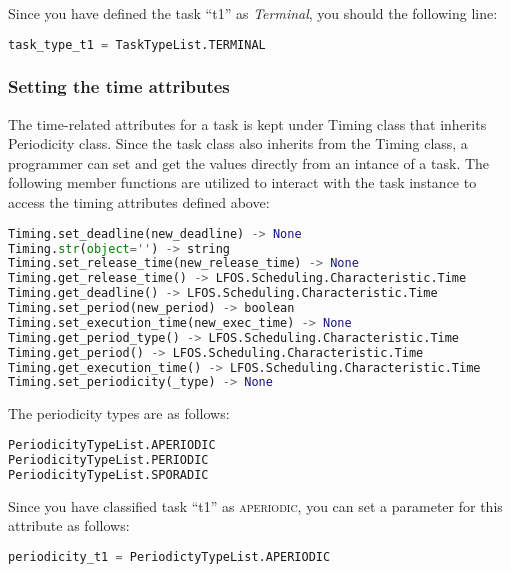 \documentclass[]{scrartcl}
\begin{document}
                
Since you have defined the task ``t1'' as \emph{Terminal}, you should the following line:

\begin{lstlisting}[language=Python, frame=single, label={lst:TaskTypeInstt1}, caption={Terminal task type definition.}]
task_type_t1 = TaskTypeList.TERMINAL
\end{lstlisting}
        
        
\subsubsection{Setting the time attributes}
The time-related attributes for a task is kept under \textsf{Timing} class that inherits \textsf{Periodicity} class. Since the task class also inherits from the Timing class, a programmer can set and get the values directly
from an intance of a task. The following member functions are utilized to interact with the task instance to access the timing attributes defined above:

\begin{lstlisting}[language=Python, frame=single, label={lst:t1memberFunctionsTiming}, caption={The member functions for \textsf{Timing} module.}]
Timing.set_deadline(new_deadline) -> None
Timing.str(object='') -> string
Timing.set_release_time(new_release_time) -> None
Timing.get_release_time() -> LFOS.Scheduling.Characteristic.Time
Timing.get_deadline() -> LFOS.Scheduling.Characteristic.Time
Timing.set_period(new_period) -> boolean
Timing.set_execution_time(new_exec_time) -> None
Timing.get_period_type() -> LFOS.Scheduling.Characteristic.Time
Timing.get_period() -> LFOS.Scheduling.Characteristic.Time
Timing.get_execution_time() -> LFOS.Scheduling.Characteristic.Time
Timing.set_periodicity(_type) -> None
\end{lstlisting}
        

The periodicity types are as follows:

\begin{lstlisting}[language=Python, frame=single, label={lst:t1PerioidictyTypeList}, caption={The \textsf{Periodicity} type enumeration.}]
PeriodicityTypeList.APERIODIC
PeriodicityTypeList.PERIODIC
PeriodicityTypeList.SPORADIC
\end{lstlisting}
        
        
Since you have classified task ``t1'' as \textsc{aperiodic}, you can set a parameter for this attribute as follows:
            

\begin{lstlisting}[language=Python, frame=single, label={lst:t1periodicitySetting}, caption={Periodicity for parameter is stored in the variable to use it later in instantiation.}]
periodicity_t1 = PeriodictyTypeList.APERIODIC
\end{lstlisting}
        
\end{document}
